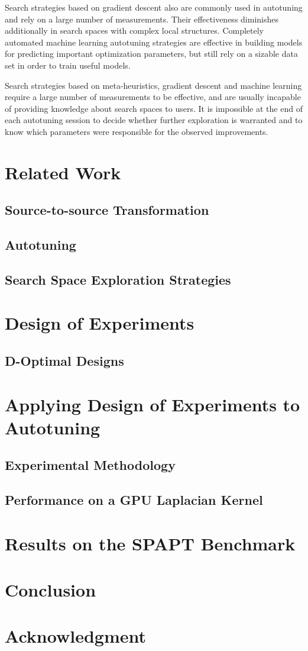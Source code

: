 \documentclass[conference]{IEEEtran}
\begin{document}
Search strategies based on gradient descent also are commonly used in autotuning
and rely on a large number of measurements. Their effectiveness diminishes
additionally in search spaces with complex local structures. Completely
automated machine learning autotuning strategies are effective in building
models for predicting important optimization parameters, but still rely on a
sizable data set in order to train useful models.

Search strategies based on meta-heuristics, gradient descent and machine
learning require a large number of measurements to be effective, and are usually
incapable of providing knowledge about search spaces to users. It is impossible
at the end of each autotuning session to decide whether further exploration is
warranted and to know which parameters were responsible for the observed
improvements.

\section{Related Work}
\label{sec:orgb511da1}
\subsection{Source-to-source Transformation}
\label{sec:orgf7342c6}
\subsection{Autotuning}
\label{sec:org9c33698}
\subsection{Search Space Exploration Strategies}
\label{sec:org6f14bf1}
\section{Design of Experiments}
\label{sec:org19a1a6e}
\subsection{D-Optimal Designs}
\label{sec:org6c071a0}
\section{Applying Design of Experiments to Autotuning}
\label{sec:org97e64a4}
\subsection{Experimental Methodology}
\label{sec:orgdb09a2e}
\subsection{Performance on a GPU Laplacian Kernel}
\label{sec:orgfb754b4}
\section{Results on the SPAPT Benchmark}
\label{sec:orgfda8502}
\section{Conclusion}
\label{sec:org99226d3}
\section*{Acknowledgment}
\label{sec:orgfbf4e92}


\end{document}

